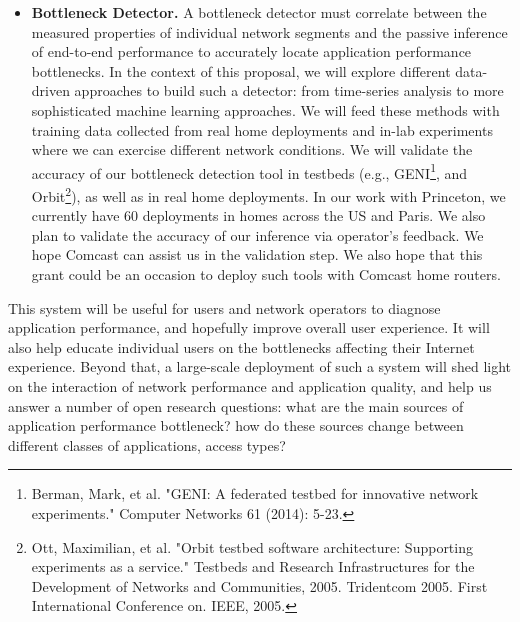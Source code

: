 \documentclass[11 pt]{article}
\begin{document}
\begin{itemize}
%

\item \textbf{Bottleneck Detector.} A bottleneck detector must correlate between the measured properties of individual network segments and the passive inference of end-to-end performance to accurately locate application performance bottlenecks. In the context of this proposal, we will explore different data-driven approaches to build such a detector: from time-series analysis to more sophisticated machine learning approaches. We will feed these methods with training data collected from real home deployments and in-lab experiments where we can exercise different network conditions. We will validate the accuracy of our bottleneck detection tool in testbeds (e.g., GENI\footnote{Berman, Mark, et al. "GENI: A federated testbed for innovative network experiments." Computer Networks 61 (2014): 5-23.}, and Orbit\footnote{Ott, Maximilian, et al. "Orbit testbed software architecture: Supporting experiments as a service." Testbeds and Research Infrastructures for the Development of Networks and Communities, 2005. Tridentcom 2005. First International Conference on. IEEE, 2005.}), as well as in real home deployments. In our work with Princeton, we currently have 60 deployments in homes across the US and Paris. We also plan to validate the accuracy of our inference via operator's feedback. We hope Comcast can assist us in the validation step. We also hope that this grant could be an occasion to deploy such tools with Comcast home routers.
\end{itemize}

This system will be useful for users and network operators to diagnose application performance, and hopefully improve overall user experience. It will also help educate individual users on the bottlenecks affecting their Internet experience. Beyond that, a large-scale deployment of such a system will shed light on the interaction of network performance and application quality, and help us answer a number of open research questions: what are the main sources of application performance bottleneck? how do these sources change between different classes of applications, access types?\\
\end{document}

